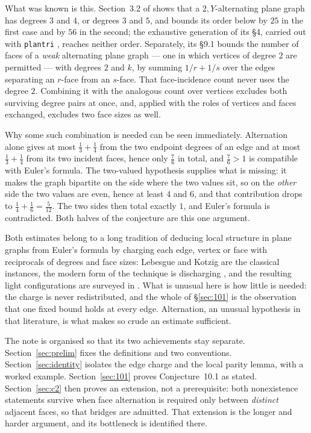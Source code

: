 \documentclass{baustms}
\theoremstyle{cupthm}
\theoremstyle{cupdefn}
\theoremstyle{cuprem}
\begin{document}
What was known is this. Section~3.2 of \cite{AHSSV2015} shows that a
$2,Y$-alternating plane graph has degrees $3$ and $4$, or degrees $3$ and $5$,
and bounds its order below by $25$ in the first case and by $56$ in the second;
the exhaustive generation of its \S4, carried out with \texttt{plantri}
\cite{BM2007}, reaches neither order. Separately, its \S9.1 bounds the number of
faces of a \emph{weak} alternating plane graph --- one in which vertices of
degree $2$ are permitted --- with degrees $2$ and $k$, by summing $1/r+1/s$ over
the edges separating an $r$-face from an $s$-face. That face-incidence count
never uses the degree $2$. Combining it with the analogous count over vertices
excludes both surviving degree pairs at once, and, applied with the roles of
vertices and faces exchanged, excludes two face sizes as well.

Why some such combination is needed can be seen immediately. Alternation alone
gives at most $\frac13+\frac14$ from the two endpoint degrees of an edge and at
most $\frac13+\frac14$ from its two incident faces, hence only
$\frac{7}{6}$ in total, and $\frac76 > 1$ is compatible with Euler's formula. The
two-valued hypothesis supplies what is missing: it makes the graph bipartite on
the side where the two values sit, so on the \emph{other} side the two values are
even, hence at least $4$ and $6$, and that contribution drops to
$\frac14+\frac16=\frac5{12}$. The two sides then total exactly $1$, and Euler's
formula is contradicted. Both halves of the conjecture are this one argument.

Both estimates belong to a long tradition of deducing local structure in plane
graphs from Euler's formula by charging each edge, vertex or face with
reciprocals of degrees and face sizes: Lebesgue \cite{Lebesgue1940} and Kotzig
\cite{Kotzig1955} are the classical instances, the modern form of the technique
is discharging \cite{CW2017}, and the resulting light configurations are
surveyed in \cite{JV2013}. What is unusual here is how little is needed: the
charge is never redistributed, and the whole of \S\ref{sec:101} is the
observation that one fixed bound holds at every edge. Alternation, an unusual
hypothesis in that literature, is what makes so crude an estimate sufficient.

The note is organised so that its two achievements stay separate.
Section~\ref{sec:prelim} fixes the definitions and two conventions. Section~\ref{sec:identity} isolates the edge charge
and the local parity lemma, with a worked example. Section~\ref{sec:101} proves
Conjecture~10.1 as stated. Section~\ref{sec:c2} then proves an extension, not a
prerequisite: both nonexistence statements survive when face alternation is
required only between \emph{distinct} adjacent faces, so that bridges are
admitted. That extension is the longer and harder argument, and its bottleneck is
identified there.
\end{document}

